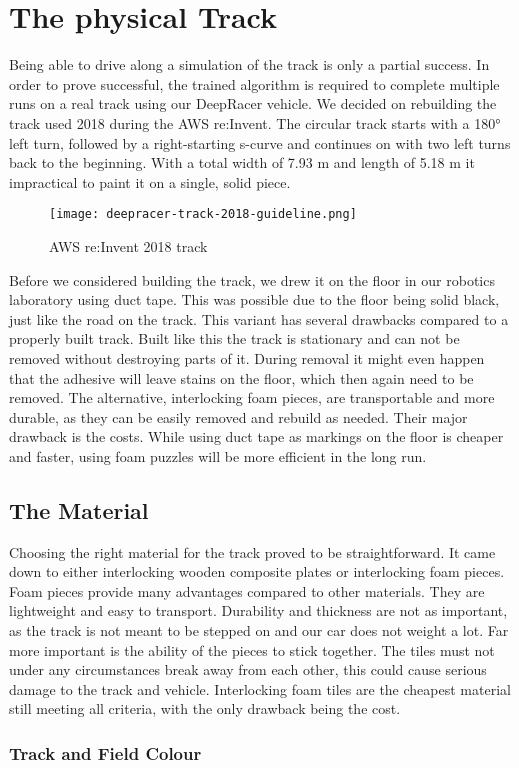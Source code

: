 \chapter{The physical Track}

Being able to drive along a simulation of the track is only a partial success. In order to prove successful, the trained algorithm is required to complete multiple runs on a real track using our DeepRacer vehicle. We decided on rebuilding the track used 2018 during the AWS re:Invent. The circular track starts with a 180° left turn, followed by a right-starting s-curve and continues on with two left turns back to the beginning. With a total width of 7.93 m and length of 5.18 m it impractical to paint it on a single, solid piece.

\begin{figure}
    \centering
    \texttt{[image: deepracer-track-2018-guideline.png]}
    \caption{AWS re:Invent 2018 track}
    \label{fig:track}
\end{figure}

Before we considered building the track, we drew it on the floor in our robotics laboratory using duct tape. This was possible due to the floor being solid black, just like the road on the track. This variant has several drawbacks compared to a properly built track. Built like this the track is stationary and can not be removed without destroying parts of it. During removal it might even happen that the adhesive will leave stains on the floor, which then again need to be removed. The alternative, interlocking foam pieces, are transportable and more durable, as they can be easily removed and rebuild as needed. Their major drawback is the costs. While using duct tape as markings on the floor is cheaper and faster, using foam puzzles will be more efficient in the long run.

\section{The Material}
Choosing the right material for the track proved to be straightforward. It came down to either interlocking wooden composite plates or interlocking foam pieces. Foam pieces provide many advantages compared to other materials. They are lightweight and easy to transport. Durability and thickness are not as important, as the track is not meant to be stepped on and our car does not weight a lot. Far more important is the ability of the pieces to stick together. The tiles must not under any circumstances break away from each other, this could cause serious damage to the track and vehicle. Interlocking foam tiles are the cheapest material still meeting all criteria, with the only drawback being the cost.

\subsection{Track and Field Colour}

